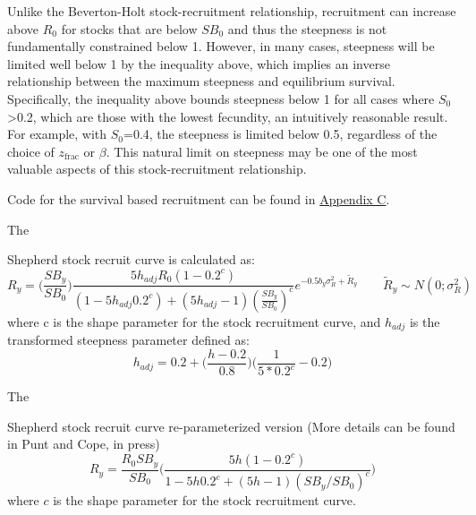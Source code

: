 Unlike the Beverton-Holt stock-recruitment relationship, recruitment can increase above $R_0$ for stocks that are below $SB_0$ and thus the steepness is not fundamentally constrained below 1. However, in many cases, steepness will be limited well below 1 by the inequality above, which implies an inverse relationship between the maximum steepness and equilibrium survival. Specifically, the inequality above bounds steepness below 1 for all cases where $S_0$>0.2, which are those with the lowest fecundity, an intuitively reasonable result. For example, with $S_0$=0.4, the steepness is limited below 0.5, regardless of the choice of $z_{\text{frac}}$ or $\beta$. This natural limit on steepness may be one of the most valuable aspects of this stock-recruitment relationship.
	
Code for the survival based recruitment can be found in \hyperlink{AppendixC}{Appendix C}.

\hypertarget{Shepherd}{The} Shepherd stock recruit curve is calculated as:
	\begin{equation}
		R_y = \bigg(\frac{SB_y}{SB_0}\bigg)\frac{5h_{adj}R_0(1-0.2^c)}{(1-5h_{adj}0.2^c)+(5h_{adj}-1)(\frac{SB_y}{SB_0})^c}e^{-0.5b_y\sigma^2_R+\tilde{R}_y}\qquad \tilde{R}_y\sim N(0;\sigma^2_R)
	\end{equation}
where c is the shape parameter for the stock recruitment curve, and $h_{adj}$ is the transformed steepness parameter defined as:
	\begin{equation}
		h_{adj}=0.2+\bigg(\frac{h-0.2}{0.8}\bigg)\bigg(\frac{1}{5*0.2^c}-0.2\bigg)
	\end{equation}

\hypertarget{Shepherd2}{The} Shepherd stock recruit curve re-parameterized version (More details can be found in Punt and Cope, in press)
	\begin{equation}
		R_y = \frac{R_0SB_y}{SB_0}\bigg(\frac{5h(1-0.2^c)}{1-5h0.2^c+(5h-1)(SB_y/SB_0)^c}\bigg)
	\end{equation}
where $c$ is the shape parameter for the stock recruitment curve.


